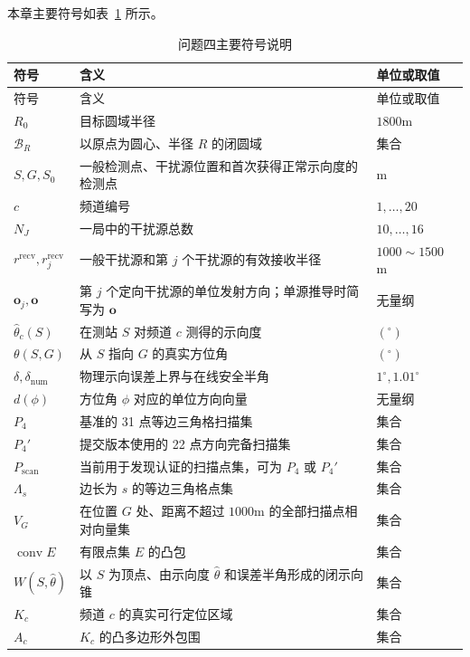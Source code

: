本章主要符号如表~\ref{tab:q4_symbols} 所示。

{\setlength{\tabcolsep}{4pt}
\begin{longtable}{@{}>{\small}p{}>{\small}p{}>{\small}p{}@{}}
\caption{问题四主要符号说明}
\label{tab:q4_symbols}\\
\toprule
符号 & 含义 & 单位或取值 \\
\midrule
\endfirsthead
\toprule
符号 & 含义 & 单位或取值 \\
\midrule
\endhead
$R_0$ & 目标圆域半径 & $1800\mathrm{m}$ \\
$\mathcal B_R$ & 以原点为圆心、半径 $R$ 的闭圆域 & 集合 \\
$S,G,S_0$ & 一般检测点、干扰源位置和首次获得正常示向度的检测点 & m \\
$c$ & 频道编号 & $1,\ldots,20$ \\
$N_J$ & 一局中的干扰源总数 & $10,\ldots,16$ \\
$r^{\mathrm{recv}},r_j^{\mathrm{recv}}$ & 一般干扰源和第 $j$ 个干扰源的有效接收半径 & $1000\sim1500$ m \\
$\boldsymbol o_j,\boldsymbol o$ & 第 $j$ 个定向干扰源的单位发射方向；单源推导时简写为 $\boldsymbol o$ & 无量纲 \\
$\hat\theta_c(S)$ & 在测站 $S$ 对频道 $c$ 测得的示向度 & $(^\circ)$ \\
$\theta(S,G)$ & 从 $S$ 指向 $G$ 的真实方位角 & $(^\circ)$ \\
$\delta,\delta_{\mathrm{num}}$ & 物理示向误差上界与在线安全半角 & $1^\circ,1.01^\circ$ \\
$d(\phi)$ & 方位角 $\phi$ 对应的单位方向向量 & 无量纲 \\
$P_4$ & 基准的 31 点等边三角格扫描集 & 集合 \\
$P_4'$ & 提交版本使用的 22 点方向完备扫描集 & 集合 \\
$P_{\mathrm{scan}}$ & 当前用于发现认证的扫描点集，可为 $P_4$ 或 $P_4'$ & 集合 \\
$\Lambda_s$ & 边长为 $s$ 的等边三角格点集 & 集合 \\
$V_G$ & 在位置 $G$ 处、距离不超过 $1000\mathrm{m}$ 的全部扫描点相对向量集 & 集合 \\
$\operatorname{conv}E$ & 有限点集 $E$ 的凸包 & 集合 \\
$W(S,\hat\theta)$ & 以 $S$ 为顶点、由示向度 $\hat\theta$ 和误差半角形成的闭示向锥 & 集合 \\
$K_c$ & 频道 $c$ 的真实可行定位区域 & 集合 \\
$A_c$ & $K_c$ 的凸多边形外包围 & 集合 \\

\end{longtable}}
